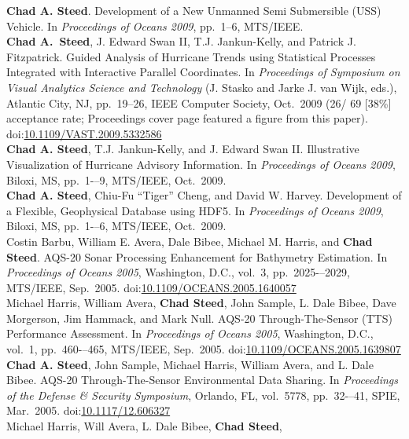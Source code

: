\documentclass[11pt, a4paper]{article}
\newcommand{\amper}{{\fontspec[Scale=.95]{Hoefler Text}\selectfont\itshape\&}}
\newcommand{\years}[1]{\marginnote{\scriptsize #1}}
\begin{document}
\begin{sloppypar}
\textbf{Chad A. Steed}.  Development of a New Unmanned Semi Submersible (USS)
Vehicle. In \emph{Proceedings of Oceans 2009}, pp.\ 1--6, MTS/IEEE.\\
\years{2009}\textbf{Chad A.~Steed}, J. Edward Swan II, T.J. Jankun-Kelly,
and Patrick J. Fitzpatrick. Guided Analysis of Hurricane Trends using
Statistical Processes Integrated with Interactive Parallel Coordinates.  In
\emph{Proceedings of Symposium on Visual Analytics Science and Technology}
(J. Stasko and Jarke J. van Wijk, eds.), Atlantic City, NJ, pp.\ 19--26, IEEE
Computer Society, Oct.\ 2009 (26/ 69 [38\%] acceptance rate; Proceedings
cover page featured a figure from this paper).
doi:\href{http://dx.doi.org/10.1109/VAST.2009.5332586}
{10.1109/VAST.2009.5332586}\\
\years{2009}\textbf{Chad A. Steed}, T.J. Jankun-Kelly,  and J. Edward Swan
II. Illustrative Visualization of Hurricane Advisory Information. In
\emph{Proceedings of Oceans 2009}, Biloxi, MS, pp.\ 1-–9, MTS/IEEE, Oct.\ 2009.\\
\years{2009}\textbf{Chad A. Steed}, Chiu-Fu ``Tiger'' Cheng, and David W.
Harvey.  Development of a Flexible, Geophysical Database using HDF5.  In
\emph{Proceedings of Oceans 2009}, Biloxi, MS, pp.\ 1-–6, MTS/IEEE, Oct.\ 2009.\\
\years{2005}Costin Barbu, William E. Avera, Dale Bibee, Michael M. Harris,
and \textbf{Chad Steed}. AQS-20 Sonar Processing Enhancement for Bathymetry
Estimation.  In \emph{Proceedings of Oceans 2005}, Washington, D.C., vol.\ 3,
pp.\ 2025-–2029, MTS/IEEE, Sep.\ 2005.
doi:\href{http://dx.doi.org/10.1109/OCEANS.2005.1640057}
{10.1109/OCEANS.2005.1640057}\\
\years{2005}Michael Harris, William Avera, \textbf{Chad Steed}, John Sample,
L. Dale Bibee, Dave Morgerson, Jim Hammack, and Mark Null.  AQS-20
Through-The-Sensor (TTS) Performance Assessment.  In \emph{Proceedings of
Oceans 2005}, Washington, D.C., vol.\ 1, pp.\ 460-–465, MTS/IEEE, Sep.\ 2005.
doi:\href{http://dx.doi.org/10.1109/OCEANS.2005.1639807}
{10.1109/OCEANS.2005.1639807}\\
\years{2005}\textbf{Chad A. Steed}, John Sample, Michael Harris, William
Avera, and L. Dale Bibee. AQS-20 Through-The-Sensor Environmental Data
Sharing.  In \emph{Proceedings of the Defense \amper{} Security Symposium},
Orlando, FL, vol.\ 5778, pp.\ 32-–41, SPIE, Mar.\ 2005.
doi:\href{http://dx.doi.org/10.1117/12.606327}{10.1117/12.606327}\\
\years{2004}Michael Harris, Will Avera, L. Dale Bibee, \textbf{Chad Steed},

\end{sloppypar}
\end{document}
